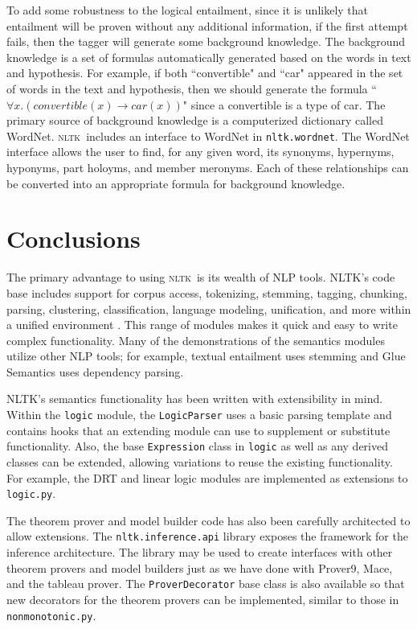 \documentclass[11pt,a4paper]{article}
\newcommand{\NLTK}{\textsc{nltk}}
\newcommand{\dhgcode}[1]{{\tt #1}}
\begin{document}
To add some robustness to the logical entailment, since it is unlikely
that entailment will be proven without any additional information, if
the first attempt fails, then the tagger will generate some background
knowledge.  The background knowledge is a set of formulas
automatically generated based on the words in text and hypothesis.
For example, if both ``convertible" and ``car" appeared in the set of
words in the text and hypothesis, then we should generate the formula
``$\forall x.(convertible(x) \rightarrow car(x))$" since a convertible
is a type of car.  The primary source of background knowledge is a
computerized dictionary called WordNet.  \NLTK\ includes an interface
to WordNet in \dhgcode{nltk.wordnet}.  The WordNet interface allows
the user to find, for any given word, its synonyms, hypernyms,
hyponyms, part holoyms, and member meronyms.  Each of these
relationships can be converted into an appropriate formula for
background knowledge.


\section{Conclusions}
The primary advantage to using \NLTK\ is its wealth of NLP tools.
NLTK's code base includes support for corpus access, tokenizing,
stemming, tagging, chunking, parsing, clustering, classification,
language modeling, unification, and more within a unified environment
\cite{Multidisciplinary}.  This range of modules makes it quick and
easy to write complex functionality.  Many of the demonstrations of
the semantics modules utilize other NLP tools; for example, textual
entailment uses stemming and Glue Semantics uses dependency parsing.

NLTK's semantics functionality has been written with extensibility in
mind.  Within the \dhgcode{logic} module, the \dhgcode{LogicParser}
uses a basic parsing template and contains hooks that an extending
module can use to supplement or substitute functionality.  Also, the
base \dhgcode{Expression} class in \dhgcode{logic} as well as any
derived classes can be extended, allowing variations to reuse the
existing functionality.  For example, the DRT and linear logic modules
are implemented as extensions to \dhgcode{logic.py}.

The theorem prover and model builder code has also been carefully
architected to allow extensions.  The \dhgcode{nltk.inference.api}
library exposes the framework for the inference architecture.  The
library may be used to create interfaces with other theorem provers
and model builders just as we have done with Prover9, Mace, and the
tableau prover.  The \dhgcode{ProverDecorator} base class is also
available so that new decorators for the theorem provers can be
implemented, similar to those in \dhgcode{nonmonotonic.py}.
\end{document}
